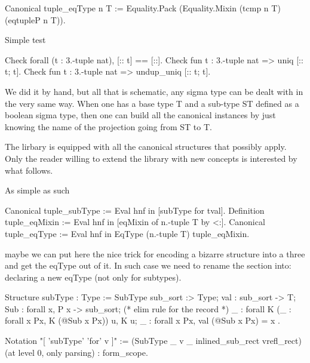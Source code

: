 \begin{coq}{}
Canonical tuple_eqType n T :=
  Equality.Pack (Equality.Mixin (tcmp n T) (eqtupleP n T)).
\end{coq}

Simple test

\begin{coq}{}
Check forall (t : 3.-tuple nat), [:: t] == [::].
Check fun t : 3.-tuple nat => uniq [:: t; t].
Check fun t : 3.-tuple nat => undup_uniq [:: t; t].
\end{coq}

We did it by hand, but all that is schematic, any sigma type can be
dealt with in the very same way.  When one has a base type T and a
sub-type ST defined as a boolean sigma type, then one can build all
the canonical instances by just knowing the name of the projection
going from ST to T.

The lirbary is equipped with all the canonical structures that
possibly apply.  Only the reader willing to extend the library with
new concepts is interested by what follows.

\mcbREQUIRE{}

As simple as such

\begin{coq}{}
Canonical tuple_subType := Eval hnf in [subType for tval].
Definition tuple_eqMixin := Eval hnf in [eqMixin of n.-tuple T by <:].
Canonical tuple_eqType := Eval hnf in EqType (n.-tuple T) tuple_eqMixin.
\end{coq}

maybe we can put here the nice trick for encoding a bizarre structure
into a three and get the eqType out of it.  In such case we need to
rename the section into: declaring a new eqType (not only for
subtypes).


\begin{coq}{}
Structure subType : Type := SubType {
  sub_sort :> Type;
  val : sub_sort -> T;
  Sub : forall x, P x -> sub_sort;
  (* elim rule for the record *)
  _ : forall K (_ : forall x Px, K (@Sub x Px)) u, K u;
  _ : forall x Px, val (@Sub x Px) = x
}.

Notation "[ 'subType' 'for' v ]" := (SubType _ v _ inlined_sub_rect vrefl_rect)
 (at level 0, only parsing) : form_scope.
\end{coq}


